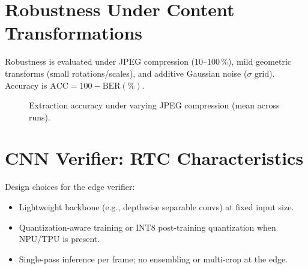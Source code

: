 
\section{Robustness Under Content Transformations}
\label{sec:validation:robustness}

Robustness is evaluated under JPEG compression (\(10\)–\(100\)\,\%), mild geometric transforms (small rotations/scales), and additive Gaussian noise (\(\sigma\) grid). Accuracy is \(\mathrm{ACC}=100-\mathrm{BER}(\%)\).

\begin{figure}[htbp]
    \centering
    \caption[Extraction accuracy vs JPEG]{Extraction accuracy under varying JPEG compression (mean across runs).}
    \label{fig:accuracy_jpeg}
\end{figure}



\section{CNN Verifier: RTC Characteristics}
\label{sec:validation:cnn}

Design choices for the edge verifier:
\begin{itemize}
    \item Lightweight backbone (e.g., depthwise separable convs) at fixed input size.
    \item Quantization-aware training or INT8 post-training quantization when NPU/TPU is present.
    \item Single-pass inference per frame; no ensembling or multi-crop at the edge.
\end{itemize}

